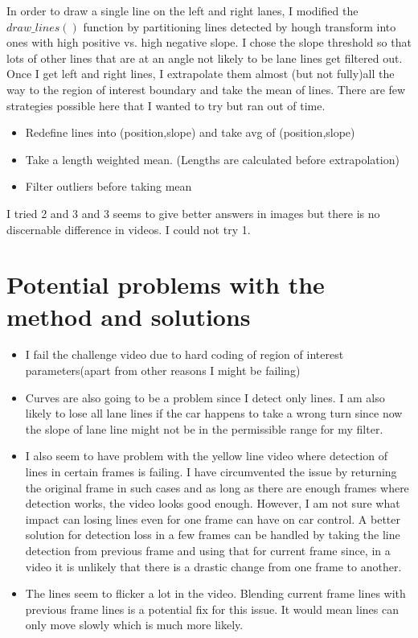 \documentclass{article}
\begin{document}
In order to draw a single line on the left and right lanes, I modified the $draw\_lines()$ function by partitioning lines detected by hough transform into ones with high positive vs. high negative slope.
I chose the slope threshold so that lots of other lines that are at an angle not likely to be lane lines get filtered out. Once I get left and right lines, I extrapolate them almost (but not fully)all the way to the 
region of interest boundary and take the mean of lines. There are few strategies possible here that I wanted to try but ran out of time. 
\begin{itemize}
\item Redefine lines into (position,slope) and take avg of (position,slope)
\item Take a length weighted mean. (Lengths are calculated before extrapolation)
\item Filter outliers before taking mean
\end{itemize}
I tried 2 and 3 and 3 seems to give better answers in images but there is no discernable difference in videos. I could not try 1.
\section{Potential problems with the method and solutions}
\begin{itemize}
\item I fail the challenge video due to hard coding of region of interest parameters(apart from other reasons I might be failing)
\item Curves are also going to be a problem since I detect only lines. I am also likely to lose all lane lines if the car happens to take a 
wrong turn since now the slope of lane line might not be in the permissible range for my filter. 
\item I also seem to have problem with the yellow line video where detection of lines
in certain frames is failing. I have circumvented the issue by returning the original  frame in such cases and as long as there are enough frames where detection works, the video looks good enough.
However, I am not sure what impact can losing lines even for one frame can have on car control. A better solution for detection loss in a few frames can be handled by taking the line detection from previous frame and using that for current frame since,
in a video it is unlikely that there is a drastic change from one frame to another. 
\item The lines seem to flicker a lot in the video. Blending current frame lines with previous frame lines is a potential fix for this issue. It would mean lines can only move slowly which is much more likely.

\end{itemize}
\end{document}
